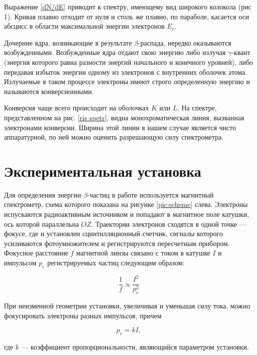 \documentclass[a4paper, 12pt]{article}%
\begin{document}
	
	Выражение \eqref{dN/dE} приводит к спектру, имеющему вид широкого колокола (рис 1). Кривая плавно отходит от нуля и столь же плавно, по параболе, касается оси абсцисс в области максимальной энергии электронов $E_e$. 
	
	Дочерние ядра, возникающие в результате $\beta$-распада, нередко оказываются возбужденными. Возбужденные ядра отдают свою энергию либо излучая $\gamma$-квант (энергия которого равна разности энергий начального и конечного уровней), либо передавая избыток энергии одному из электронов с внутренних оболочек атома. Излучаемые в таком процессе электроны имеют строго определенную энергию и называются конверсионными.
	
	Конверсия чаще всего происходит на оболочках $ K $ или $ L $. На спектре, представленном на рис. \ref{ris spetr}, видна монохроматическая линия, вызванная электронами конверсии. Ширина этой линии в нашем случае является чисто аппаратурной, по ней можно оценить разрешающую силу спектрометра.
	
	
	\section{Экспериментальная установка}
	
	Для определения энергии $\beta$-частиц в работе используется магнитный спектрометр, схема которого показана на рисунке \ref{pic:scheme} слева. Электроны испускаются радиоактивным источником и попадают в магнитное поле катушки, ось которой параллельна $OZ$. Траектории электронов сходятся в одной точке --- фокусе, где и установлен сцинтилляционный счетчик, сигналы которого усиливаются фотоумножителем и регистрируются пересчетным прибором. Фокусное расстояние $f$ магнитной линзы связано с током в катушке $I$ и импульсом $p_e$ регистрируемых частиц следующим образом:
	
	\[ \frac{1}{f} \propto \frac{I^2}{p_e^2} \]  
	
	При неизменной геометрии установки, увеличивая и уменьшая силу тока, можно фокусировать электроны разных импульсов, причем 
	
	\begin{equation}\label{k}
		p_e = kI,
	\end{equation}
	
	где $k$ --- коэффициент пропорциональности, являющийся параметром установки.
	
\end{document}
